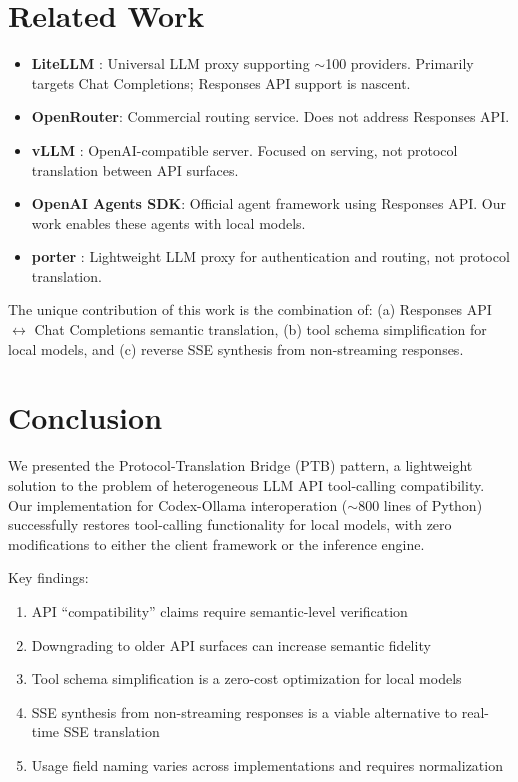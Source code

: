 \documentclass[11pt,a4paper]{article}
\begin{document}
\section{Related Work}

\begin{itemize}
  \item \textbf{LiteLLM} \cite{litellm}: Universal LLM proxy supporting
        $\sim$100 providers. Primarily targets Chat Completions; Responses
        API support is nascent.
  \item \textbf{OpenRouter}: Commercial routing service. Does not address
        Responses API.
  \item \textbf{vLLM} \cite{vllm}: OpenAI-compatible server. Focused on
        serving, not protocol translation between API surfaces.
  \item \textbf{OpenAI Agents SDK}: Official agent framework using
        Responses API. Our work enables these agents with local models.
  \item \textbf{porter} \cite{porter}: Lightweight LLM proxy for
        authentication and routing, not protocol translation.
\end{itemize}

The unique contribution of this work is the combination of: (a) Responses
API $\leftrightarrow$ Chat Completions semantic translation, (b) tool
schema simplification for local models, and (c) reverse SSE synthesis from
non-streaming responses.

\section{Conclusion}

We presented the Protocol-Translation Bridge (PTB) pattern, a lightweight
solution to the problem of heterogeneous LLM API tool-calling compatibility.
Our implementation for Codex-Ollama interoperation ($\sim$800 lines of
Python) successfully restores tool-calling functionality for local models,
with zero modifications to either the client framework or the inference
engine.

Key findings:
\begin{enumerate}[nosep]
  \item API ``compatibility'' claims require semantic-level verification
  \item Downgrading to older API surfaces can increase semantic fidelity
  \item Tool schema simplification is a zero-cost optimization for local models
  \item SSE synthesis from non-streaming responses is a viable alternative
        to real-time SSE translation
  \item Usage field naming varies across implementations and requires normalization
\end{enumerate}
\end{document}
